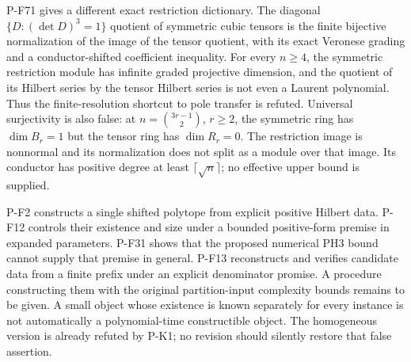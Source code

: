\begin{description}
P-F71 gives a different exact restriction dictionary.  The
diagonal $\{D:(\det D)^3=1\}$ quotient of symmetric cubic
tensors is the finite bijective normalization of the image of
the tensor quotient, with its exact Veronese grading and a
conductor-shifted coefficient inequality.  For every $n\ge4$,
the symmetric restriction module has infinite graded projective
dimension, and the quotient of its Hilbert series by the tensor
Hilbert series is not even a Laurent polynomial.  Thus the
finite-resolution shortcut to pole transfer is refuted.
Universal surjectivity is also false: at
$n=\binom{3r-1}{2}$, $r\ge2$, the symmetric ring has
$\dim B_r=1$ but the tensor ring has $\dim R_r=0$.
The restriction image is nonnormal and its normalization
does not split as a module over that image.  Its conductor
has positive degree at least $\lceil\sqrt n\rceil$;
no effective upper bound is supplied.

\item[O-COUNT: uniform effective shifted counting.]
P-F2 constructs a single shifted polytope from explicit positive Hilbert
data. P-F12 controls their existence and size under a bounded
positive-form premise in expanded parameters. P-F31 shows that the
proposed numerical PH3 bound cannot supply that premise in general. P-F13 reconstructs
and verifies candidate data from a finite prefix under an explicit
denominator promise. A procedure constructing them with the original
partition-input complexity bounds remains to be given. A small object
whose existence is known separately for every instance is not automatically
a polynomial-time constructible object. The homogeneous version is already
refuted by P-K1; no revision should silently restore that false assertion.


\end{description}
